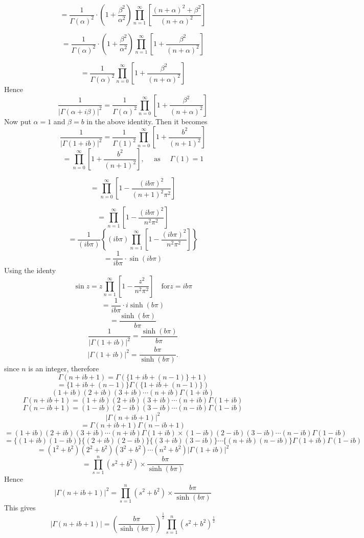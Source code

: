 \documentclass{styles/kaobook}
\begin{document}
$$
=\frac{1}{\Gamma(\alpha)^{2}} \cdot\left(1+\frac{\beta^{2}}{\alpha^{2}}\right) \prod_{n=1}^{\infty}\left[\frac{(n+\alpha)^{2}+\beta^{2}}{(n+\alpha)^{2}}\right]
$$

$$
=\frac{1}{\Gamma(\alpha)^{2}} \cdot\left(1+\frac{\beta^{2}}{\alpha^{2}}\right) \prod_{n=1}^{\infty}\left[1+\frac{\beta^{2}}{(n+\alpha)^{2}}\right]
$$

$$
=\frac{1}{\Gamma(\alpha)^{2}} \prod_{n=0}^{\infty}\left[1+\frac{\beta^{2}}{(n+\alpha)^{2}}\right]
$$
Hence
$$
\frac{1}{|\Gamma(\alpha+i \beta)|^{2}}=\frac{1}{\Gamma(\alpha)^{2}} \prod_{n=0}^{\infty}\left[1+\frac{\beta^{2}}{(n+\alpha)^{2}}\right]
$$
Now put $\alpha=1$ and $\beta=b$ in the above identity. Then it becomes
$$
\frac{1}{|\Gamma(1+i b)|^{2}}=\frac{1}{\Gamma(1)^{2}} \prod_{n=0}^{\infty}\left[1+\frac{b^{2}}{(n+1)^{2}}\right]
$$
$$
=\prod_{n=0}^{\infty}\left[1+\frac{b^{2}}{(n+1)^{2}}\right], \quad \text { as } \quad \Gamma(1)=1
$$

$$
=\prod_{n=0}^{\infty}\left[1-\frac{(i b \pi)^{2}}{(n+1)^{2} \pi^{2}}\right]
$$

$$
=\prod_{n=1}^{\infty}\left[1-\frac{(i b \pi)^{2}}{n^{2} \pi^{2}}\right]
$$
$$
=\frac{1}{(i b \pi)}\left\{(i b \pi) \prod_{n=1}^{\infty}\left[1-\frac{(i b \pi)^{2}}{n^{2} \pi^{2}}\right]\right\}
$$
$$
=\frac{1}{i b \pi} \cdot \sin (i b \pi)
$$
Using the identy
$$
\sin z=z \prod_{n=1}^{\infty}\left[1-\frac{z^{2}}{n^{2} \pi^{2}}\right] \quad \text{for} z=ib\pi
$$
$$=\frac{1}{i b \pi} \cdot i \sinh (b \pi)$$
$$=\frac{\sinh (b \pi)}{b \pi}$$
$$\frac{1}{|\Gamma(1+i b)|^{2}}=\frac{\sinh (b \pi)}{b \pi}$$
$$|\Gamma(1+i b)|^{2}=\frac{b \pi}{\sinh (b \pi)} .$$
since $n$ is an integer, therefore
$$\Gamma(n+i b+1)=\Gamma(\{1+i b+(n-1)\}+1)$$
$$=\{1+i b+(n-1)\} \Gamma(\{1+i b+(n-1)\})$$
$$
(1+i b)(2+i b)(3+i b) \cdots(n+i b) \Gamma(1+i b)
$$
$$
\Gamma(n+i b+1)=(1+i b)(2+i b)(3+i b) \cdots(n+i b) \Gamma(1+i b)
$$
$$
\Gamma(n-i b+1)=(1-i b)(2-i b)(3-i b) \cdots(n-i b) \Gamma(1-i b)
$$
$$|\Gamma(n+i b+1)|^{2}$$
$$=\Gamma(n+i b+1) \Gamma(n-i b+1)$$
$$=(1+i b)(2+i b)(3+i b) \cdots(n+i b) \Gamma(1+i b) \times(1-i b)(2-i b)(3-i b) \cdots(n-i b) \Gamma(1-i b)$$
$$=\{(1+i b)(1-i b)\}\{(2+i b)(2-i b)\}\{(3+i b)(3-i b)\} \cdots\{(n+i b)(n-i b)\} \Gamma(1+i b) \Gamma(1-i b)$$
$$=\left(1^{2}+b^{2}\right)\left(2^{2}+b^{2}\right)\left(3^{2}+b^{2}\right) \cdots\left(n^{2}+b^{2}\right)|\Gamma(1+i b)|^{2}$$
$$
=\prod_{s=1}^{n}\left(s^{2}+b^{2}\right) \times \frac{b \pi}{\sinh (b \pi)}
$$
Hence 
$$|\Gamma(n+i b+1)|^{2}=\prod_{s=1}^{n}\left(s^{2}+b^{2}\right) \times \frac{b \pi}{\sinh (b \pi)}$$
This gives 
$$|\Gamma(n+i b+1)|=\left(\frac{b \pi}{\sinh (b \pi)}\right)^{\frac{1}{2}} \prod_{s=1}^{n}\left(s^{2}+b^{2}\right)^{\frac{1}{2}} $$
\end{document}
